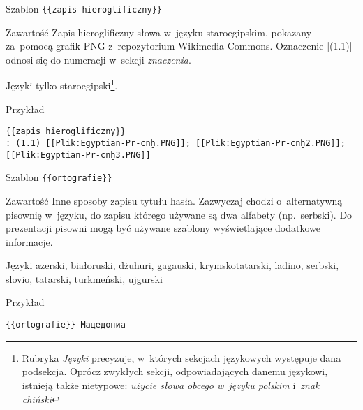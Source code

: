 \begin{opis}
	\item[Szablon] \verb|{{zapis hieroglificzny}}|
	\item[Zawartość] Zapis hieroglificzny słowa w~języku staroegipskim, pokazany za~pomocą grafik PNG z~repozytorium Wikimedia Commons. Oznaczenie \kod|(1.1)| odnosi się do numeracji w~sekcji \emph{znaczenia}.
	\item[Języki] tylko staroegipski\footnote{Rubryka \emph{Języki} precyzuje, w~których sekcjach językowych występuje dana podsekcja. Oprócz zwykłych sekcji, odpowiadających danemu językowi, istnieją także nietypowe: \emph{użycie słowa obcego w~języku polskim} i~\emph{znak chiński}}.
	\item[Przykład]
\begin{lstlisting}
{{zapis hieroglificzny}}
: (1.1) [[Plik:Egyptian-Pr-cnḫ.PNG]]; [[Plik:Egyptian-Pr-cnḫ2.PNG]]; [[Plik:Egyptian-Pr-cnḫ3.PNG]]
\end{lstlisting}
\end{opis}
\spacer
\begin{opis}
	\item[Szablon] \verb|{{ortografie}}|
	\item[Zawartość] Inne sposoby zapisu tytułu hasła. Zazwyczaj chodzi o~alternatywną pisownię w~języku, do zapisu którego używane są dwa alfabety (np.\ serbski). Do prezentacji pisowni mogą być używane szablony wyświetlające dodatkowe informacje.
	\item[Języki] azerski, białoruski, dżuhuri, gagauski, krymskotatarski, ladino, serbski, slovio, tatarski, turkmeński, ujgurski
	\item[Przykład]
\begin{lstlisting}
{{ortografie}} Мацедониа
\end{lstlisting}
\end{opis}
\spacer
